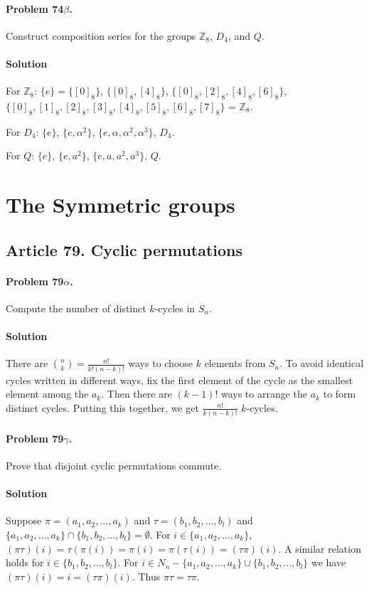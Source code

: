 \paragraph{Problem 74$\beta$.}
Construct composition series for the groups $\mathbb{Z}_8$, $D_4$, and $Q$.

\paragraph*{Solution}
For $\mathbb{Z}_8$: $\{e\} = \{[0]_8\}$, $\{[0]_8, [4]_8\}$, $\{[0]_8, [2]_8, [4]_8, [6]_8\}$,
$\{[0]_8, [1]_8, [2]_8, [3]_8, [4]_8, [5]_8, [6]_8, [7]_8\}$ = $\mathbb{Z}_8$.

For $D_4$: $\{e\}$, $\{e, \alpha^2\}$, $\{e, \alpha, \alpha^2, \alpha^3\}$, $D_4$.

For $Q$: $\{e\}$, $\{e, a^2\}$, $\{e, a, a^2, a^3\}$, $Q$.


\section{The Symmetric groups}


\subsection{Article 79. Cyclic permutations}

\paragraph{Problem 79$\alpha$.}
Compute the number of distinct $k$-cycles in $S_n$.

\paragraph*{Solution}
There are $\binom{n}{k} = \frac{n!}{k!(n-k)!}$
ways to choose $k$ elements from $S_n$. To avoid identical cycles written in
different ways, fix the first element of the cycle as the smallest element among
the $a_k$. Then there are $(k-1)!$ ways to arrange the $a_k$ to form distinct
cycles. Putting this together, we get $ \frac{n!}{k(n-k)!}$ $k$-cycles.

\paragraph{Problem 79$\gamma$.}
Prove that disjoint cyclic permutations commute.

\paragraph*{Solution}
Suppose $\pi = (a_1, a_2, \dots, a_k)$ and $\tau = (b_1, b_2, \dots, b_l)$ and
$\{ a_1, a_2, \dots, a_k \} \cap \{ b_1, b_2, \dots, b_l \} = \emptyset$.
For $ i \in \{ a_1, a_2, \dots, a_k \} $, $(\pi \tau)(i) = \tau(\pi (i)) =
\pi(i) = \pi(\tau(i)) = (\tau \pi)(i)$. A similar relation holds for $ i \in
\{ b_1, b_2, \dots, b_l \}$. For $i \in N_n - \{ a_1, a_2, \dots, a_k \} \cup
\{ b_1, b_2, \dots, b_l \}$ we have $(\pi \tau)(i) = i = (\tau \pi)(i)$. Thus
$\pi \tau = \tau \pi$.

